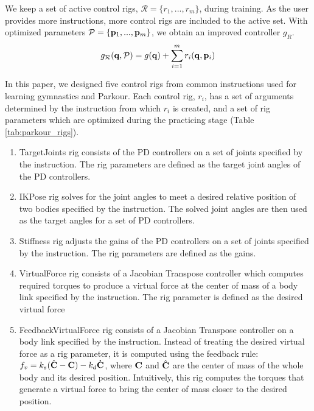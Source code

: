 We keep a set of active control rigs, $\mathcal{R} = \{r_1, ..., r_m\}$, during
training. As the user provides more instructions, more control rigs
are included to the active set. With optimized parameters $\mathcal{P} = \{\mathbf{p}_1,
..., \mathbf{p}_m\}$, we obtain an improved controller $g_R$.
\begin{equation}
  \begin{aligned}
    g_{\mathcal{R}}(\mathbf{q}, \mathcal{P}) = g(\mathbf{q}) + \sum_{i=1}^m r_i(\mathbf{q}, \mathbf{p}_i)
  \end{aligned}
\end{equation} 

In this paper, we designed five control rigs from common instructions
used for learning gymnastics and Parkour. Each control rig,
$r_i$, has a set of arguments determined by the instruction from which
$r_i$ is created, and a set of rig parameters which are optimized
during the practicing stage (Table \ref{tab:parkour_rigs}).

\begin{enumerate}
\item{TargetJoints rig consists of the PD
      controllers on a set of joints specified by the instruction. The
      rig parameters are defined as the target joint angles of the PD controllers.}
\item{IKPose rig solves for the joint angles to meet a desired
      relative position of two bodies specified by the instruction. The
      solved joint angles are then used as the target angles for a set
      of PD controllers. }
\item{Stiffness rig adjusts the gains of the PD
  controllers on a set of joints specified by the instruction. The rig
  parameters are defined as the gains. }
\item{VirtualForce rig consists of a Jacobian Transpose
  controller which computes required torques to produce a virtual
  force at the center of mass of a body link specified by the instruction. The rig parameter is
  defined as the desired virtual force}
\item{FeedbackVirtualForce rig consists of a Jacobian
      Transpose controller on a body link specified by the
      instruction. Instead of treating the desired virtual force as a
      rig parameter, it is computed using the feedback rule:
      $f_v = k_s(\hat{\mathbf{C}} - \mathbf{C}) - k_d\mathbf{\dot{C}}$, where
      $\mathbf{C}$ and $\hat{\mathbf{C}}$ are the center of mass of the whole body and its
      desired position. Intuitively, this rig computes the torques that generate
      a virtual force to bring the center of mass closer to the desired position.}
\end{enumerate} 


